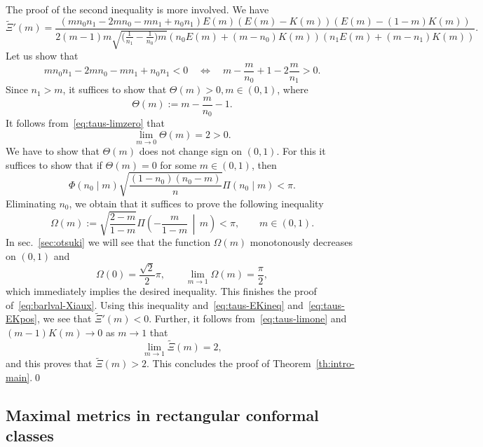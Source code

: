 \documentclass{amsart}
\newcommand{\bigmid}{\,\middle\vert\,}
\theoremstyle{plain}
\theoremstyle{definition}
\theoremstyle{remark}
\begin{document}
The proof of the second inequality is more involved. We have
\[
\widetilde\Xi'(m)=\frac{(mn_0n_1-2mn_0-mn_1+n_0 n_1)E(m)(E(m)-K(m))(E(m)-(1-m)K(m))}
{2(m-1)m\sqrt{\bigl(\frac{1}{n_1}-\frac{1}{n_0}\bigr)m}(n_0 E(m)+(m-n_0)K(m))
(n_1 E(m)+(m-n_1)K(m))}.
\]
Let us show that
\begin{equation}\label{eq:barlval-Xiaux}
mn_0n_1-2mn_0-mn_1+n_0 n_1<0\quad\Leftrightarrow\quad
m-\frac{m}{n_0}+1-2\frac{m}{n_1}>0.
\end{equation}
Since \(n_1>m\), it suffices to show that \(\Theta(m)>0,m\in (0,1)\), where
\[
\Theta(m):=m-\frac{m}{n_0}-1.
\]
It follows from~\eqref{eq:taus-limzero} that
\[
\lim_{m\to 0}\Theta(m)=2>0.
\]
We have to show that \(\Theta(m)\) does not change sign on \((0,1)\). For this
it suffices to show that if \(\Theta(m)=0\) for some \(m\in (0,1)\), then
\[
\Phi(n_0\mid m)\sqrt{\frac{(1-n_0)(n_0-m)}n}\Pi(n_0\mid m)<\pi.
\]
Eliminating \(n_0\), we obtain that it suffices to prove the following
inequality
\[
\Omega(m):=\sqrt{\frac{2-m}{1-m}}\Pi\left(-\frac{m}{1-m}\bigmid m\right)<\pi,
\qquad m\in (0,1).
\]
In sec.~\ref{sec:otsuki} we will see that the function \(\Omega(m)\)
monotonously decreases on \((0,1)\) and
\[
\Omega(0)=\frac{\sqrt 2}2\pi,\qquad
\lim_{m\to 1}\Omega(m)=\frac{\pi}2,
\]
which immediately implies the desired inequality. This finishes the proof
of~\eqref{eq:barlval-Xiaux}. Using this inequality and~\eqref{eq:taus-EKineq}
and~\eqref{eq:taus-EKpos}, we see that \(\widetilde\Xi'(m)<0\). Further, it
follows from~\eqref{eq:taus-limone} and \((m-1)K(m)\to 0\) as \(m\to 1\) that
\[
\lim_{m\to 1}\widetilde\Xi(m)=2,
\]
and this proves that \(\widetilde\Xi(m)>2\). This concludes the proof of
Theorem~\ref{th:intro-main}.\qed

\subsection{Maximal metrics in rectangular conformal classes}
\end{document}
